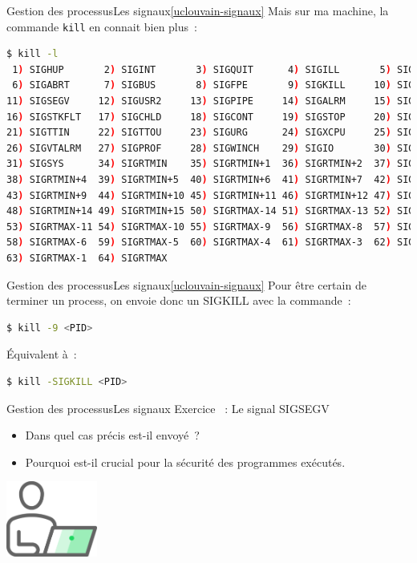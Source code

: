 \documentclass{beamer}
\begin{document}
    \begin{frame}[fragile]{Gestion des processus}{Les signaux\cref{uclouvain-signaux}}
        Mais sur ma machine, la commande \lstinline{kill} en connait bien plus~:
        \begin{lstlisting}[language=bash]
$ kill -l
 1) SIGHUP       2) SIGINT       3) SIGQUIT      4) SIGILL       5) SIGTRAP
 6) SIGABRT      7) SIGBUS       8) SIGFPE       9) SIGKILL     10) SIGUSR1
11) SIGSEGV     12) SIGUSR2     13) SIGPIPE     14) SIGALRM     15) SIGTERM
16) SIGSTKFLT   17) SIGCHLD     18) SIGCONT     19) SIGSTOP     20) SIGTSTP
21) SIGTTIN     22) SIGTTOU     23) SIGURG      24) SIGXCPU     25) SIGXFSZ
26) SIGVTALRM   27) SIGPROF     28) SIGWINCH    29) SIGIO       30) SIGPWR
31) SIGSYS      34) SIGRTMIN    35) SIGRTMIN+1  36) SIGRTMIN+2  37) SIGRTMIN+3
38) SIGRTMIN+4  39) SIGRTMIN+5  40) SIGRTMIN+6  41) SIGRTMIN+7  42) SIGRTMIN+8
43) SIGRTMIN+9  44) SIGRTMIN+10 45) SIGRTMIN+11 46) SIGRTMIN+12 47) SIGRTMIN+13
48) SIGRTMIN+14 49) SIGRTMIN+15 50) SIGRTMAX-14 51) SIGRTMAX-13 52) SIGRTMAX-12
53) SIGRTMAX-11 54) SIGRTMAX-10 55) SIGRTMAX-9  56) SIGRTMAX-8  57) SIGRTMAX-7
58) SIGRTMAX-6  59) SIGRTMAX-5  60) SIGRTMAX-4  61) SIGRTMAX-3  62) SIGRTMAX-2
63) SIGRTMAX-1  64) SIGRTMAX
        \end{lstlisting}
    \end{frame}

    \begin{frame}[fragile]{Gestion des processus}{Les signaux\cref{uclouvain-signaux}}
        Pour être certain de terminer un process, on envoie donc un SIGKILL avec la commande~:
        \begin{lstlisting}[language=bash]
$ kill -9 <PID>
        \end{lstlisting}
        Équivalent à~:
        \begin{lstlisting}[language=bash]
$ kill -SIGKILL <PID>
        \end{lstlisting}
    \end{frame}

    \begin{frame}{Gestion des processus}{Les signaux}
        Exercice \execcounterdispinc{}~:
        Le signal SIGSEGV
        \begin{itemize}
            \item Dans quel cas précis est-il envoyé~?
            \item Pourquoi est-il crucial pour la sécurité des programmes exécutés.
        \end{itemize}
        \bigbreak
        \centering
        \includegraphics[width=3cm]{image/guy-in-front-of-desktop}
    \end{frame}
\end{document}
